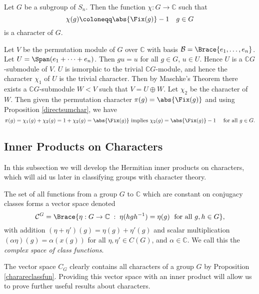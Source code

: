 \documentclass[../Project.tex]{subfiles}
\begin{document}
\begin{prop}[{\cite[Proposition 13.24]{2}}]
	\label{fixchar}
	Let $G$ be a subgroup of $S_n$. Then the function $\chi : G \to \mathbb{C}$ such that
	$$\chi(g) \coloneqq \abs{\Fix(g)} - 1\quad g \in G$$
	is a character of $G$.
\end{prop}
\begin{proo*}[{\cite[Proposition 13.24]{2}}]
	Let $V$ be the permutation module of $G$ over $\mathbb{C}$ with basis $\mathcal{B} = \Brace{e_1,\dots,e_n}$. Let $U = \Span(e_1 + \cdots + e_n)$.
	Then $gu = u$ for all $g \in G$, $u \in U$. Hence $U$ is a $\mathbb{C}G$-submodule of $V$. $U$ is ismorphic to the trivial $\mathbb{C}G$-module, and hence the character $\chi_1$ of $U$ is the trivial character. Then by Maschke's Theorem there exists a $\mathbb{C}G$-submodule $W < V$ such that $V = U \oplus W$. Let $\chi_2$ be the character of $W$. Then given the permutation character $\pi(g) = \abs{\Fix(g)}$ and using Proposition \ref{directsumchar}, we have
	$$\pi(g) = \chi_1(g) + \chi_2(g) = 1 + \chi_2(g) = \abs{\Fix(g)} \text{ implies }\chi_2(g) = \abs{\Fix(g)} - 1 \quad \text{ for all } g \in G.$$
\end{proo*}

\newpage
\subsection{Inner Products on Characters}
In this subsection we will develop the Hermitian inner products on characters, which will aid us later in classifying groups with character theory.\\

\begin{defi}
	The set of all functions from a group $G$ to $\mathbb{C}$ which are constant on conjugacy classes forms a vector space denoted $$\mathcal{C}^G = \Brace{\eta : G \to \mathbb{C}\;:\;\eta(hgh^{-1}) = \eta(g)\;\text{ for all } g,h \in G},$$ with addition $(\eta + \eta')(g) = \eta(g) + \eta'(g)$ and scalar multiplication $(\alpha \eta)(g)= \alpha(x(g))$ for all $\eta,\eta' \in C(G)$, and $\alpha \in \mathbb{C}$. We call this the \textit{complex space of class functions}.\\
\end{defi}

The vector space $C_G$ clearly contains all characters of a group $G$ by Proposition \ref{charareclassfun}. Providing this vector space with an inner product will allow us to prove further useful results about characters.\\
\end{document}
